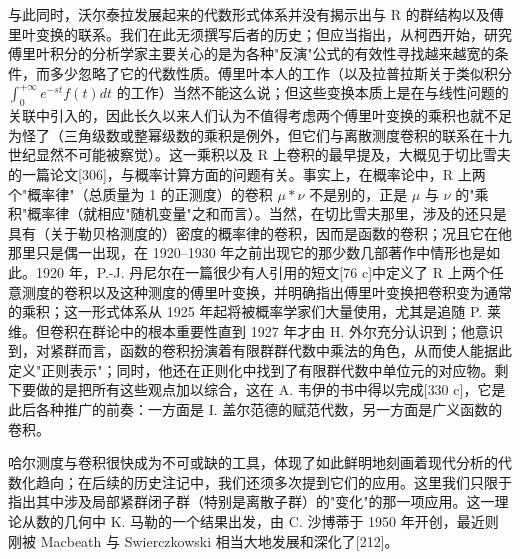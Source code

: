 与此同时，沃尔泰拉发展起来的代数形式体系并没有揭示出与 R 的群结构以及傅里叶变换的联系。我们在此无须撰写后者的历史；但应当指出，从柯西开始，研究傅里叶积分的分析学家主要关心的是为各种"反演"公式的有效性寻找越来越宽的条件，而多少忽略了它的代数性质。傅里叶本人的工作（以及拉普拉斯关于类似积分 \(\int_{0}^{+\infty} e^{-st} f(t) dt\) 的工作）当然不能这么说；但这些变换本质上是在与线性问题的关联中引入的，因此长久以来人们认为不值得考虑两个傅里叶变换的乘积也就不足为怪了（三角级数或整幂级数的乘积是例外，但它们与离散测度卷积的联系在十九世纪显然不可能被察觉）。这一乘积以及 R 上卷积的最早提及，大概见于切比雪夫的一篇论文{[}306{]}，与概率计算方面的问题有关。事实上，在概率论中，R 上两个"概率律"（总质量为 1 的正测度）的卷积 \(\mu * \nu\) 不是别的，正是 \(\mu\) 与 \(\nu\) 的"乘积"概率律（就相应"随机变量"之和而言）。当然，在切比雪夫那里，涉及的还只是具有（关于勒贝格测度的）密度的概率律的卷积，因而是函数的卷积；况且它在他那里只是偶一出现，在 1920–1930 年之前出现它的那少数几部著作中情形也是如此。1920 年，P.-J. 丹尼尔在一篇很少有人引用的短文{[}76 c{]}中定义了 R 上两个任意测度的卷积以及这种测度的傅里叶变换，并明确指出傅里叶变换把卷积变为通常的乘积；这一形式体系从 1925 年起将被概率学家们大量使用，尤其是追随 P. 莱维。但卷积在群论中的根本重要性直到 1927 年才由 H. 外尔充分认识到；他意识到，对紧群而言，函数的卷积扮演着有限群群代数中乘法的角色，从而使人能据此定义"正则表示"；同时，他还在正则化中找到了有限群代数中单位元的对应物。剩下要做的是把所有这些观点加以综合，这在 A. 韦伊的书中得以完成{[}330 c{]}，它是此后各种推广的前奏：一方面是 I. 盖尔范德的赋范代数，另一方面是广义函数的卷积。

哈尔测度与卷积很快成为不可或缺的工具，体现了如此鲜明地刻画着现代分析的代数化趋向；在后续的历史注记中，我们还须多次提到它们的应用。这里我们只限于指出其中涉及局部紧群闭子群（特别是离散子群）的"变化"的那一项应用。这一理论从数的几何中 K. 马勒的一个结果出发，由 C. 沙博蒂于 1950 年开创，最近则刚被 Macbeath 与 Swierczkowski 相当大地发展和深化了{[}212{]}。


